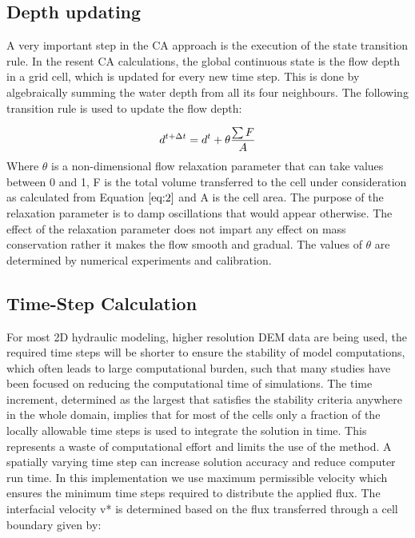 \subsection*{Depth updating}
A very important step in the CA approach is the execution of the state transition rule. In the resent CA calculations, the global continuous state is the flow depth in a grid cell, which is updated for every new time step. This is done by algebraically summing the water depth from all its four neighbours. The following transition rule is used to update the flow depth:

\begin{equation} \label{eq:3}
	\Large d^{t+\Delta{t}} = d^{t} + \theta \frac{\sum F}{A}
\end{equation}
Where $\theta$ is a non-dimensional flow relaxation parameter that can take values between 0 and 1, F is the total volume transferred to the cell under consideration as calculated from Equation $\ref{eq:2}$ and A is the cell area. The purpose of the relaxation parameter is to damp oscillations that would appear otherwise. The effect of the relaxation parameter does not impart any effect on mass conservation rather it makes the flow smooth and gradual. The values of $\theta$ are determined by numerical experiments and calibration.

\subsection*{Time-Step Calculation}

For most 2D hydraulic modeling, higher resolution DEM data are being used, the required time steps will be shorter to ensure the stability of model computations, which often leads to large computational burden, such that many studies have been focused on reducing the computational time of simulations. The time increment, determined as the largest that satisfies the stability criteria anywhere in the whole domain, implies that for most of the cells only a fraction of the locally allowable time steps is used to integrate the solution in time. This represents a waste of computational effort and limits the use of the method. A spatially varying time step can increase solution accuracy and reduce computer run time. In this implementation we use maximum permissible velocity which ensures the minimum time steps required to distribute the applied flux. The interfacial velocity v* is determined based on the flux transferred through a cell boundary given by:

